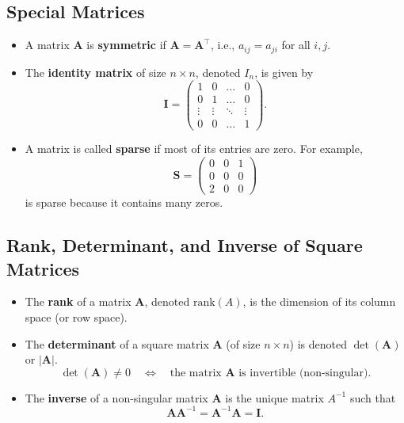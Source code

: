 \documentclass[12pt]{article}
\begin{document}
\subsection*{Special Matrices}
\begin{itemize}
    \item A matrix $\bm{A}$ is \textbf{symmetric} if $\bm{A} = \bm{A}^\top$, i.e., $a_{ij} = a_{ji}$ for all $i, j$.
    \item The \textbf{identity matrix} of size $n \times n$, denoted $I_n$, is given by
    \[
        \bm{I} = 
        \begin{pmatrix}
            1 & 0 & \dots & 0 \\
            0 & 1 & \dots & 0 \\
            \vdots & \vdots & \ddots & \vdots \\
            0 & 0 & \dots & 1
        \end{pmatrix}.
    \]
    \item A matrix is called \textbf{sparse} if most of its entries are zero. For example,
    \[
        \bm{S} = 
        \begin{pmatrix}
            0 & 0 & 1 \\
            0 & 0 & 0 \\
            2 & 0 & 0
        \end{pmatrix}
    \]
    is sparse because it contains many zeros.
\end{itemize}

\subsection*{Rank, Determinant, and Inverse of Square Matrices}
\begin{itemize}
    \item The \textbf{rank} of a matrix $\bm{A}$, denoted $\mathrm{rank}(A)$, is the dimension of its column space (or row space). 
    \item The \textbf{determinant} of a square matrix $\bm{A}$ (of size $n \times n$) is denoted $\det(\bm{A})$ or $|\bm{A}|$. 
        \[
            \det(\bm{A}) \neq 0 \quad \Longleftrightarrow \quad \text{the matrix $\bm{A}$ is invertible (non-singular).}
        \]
    \item The \textbf{inverse} of a non-singular matrix $\bm{A}$ is the unique matrix $A^{-1}$ such that
        \[
            \bm{A} \bm{A}^{-1} = \bm{A}^{-1} \bm{A} = \bm{I}.
        \]
\end{itemize}
\end{document}
